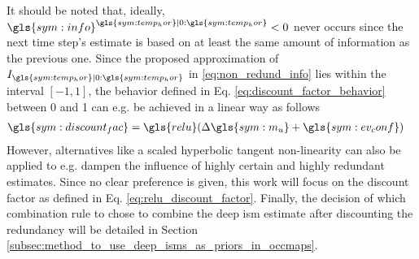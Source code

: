 It should be noted that, ideally, $\gls{sym:info}^{\gls{sym:temp_hor}|0:\gls{sym:temp_hor}} < 0$ never occurs since the next time step's estimate is based on at least the same amount of information as the previous one. Since the proposed approximation of $I_{\gls{sym:temp_hor}|0:\gls{sym:temp_hor}}$ in \eqref{eq:non_redund_info} lies within the interval $[-1,1]$, the behavior defined in Eq. \ref{eq:discount_factor_behavior} between 0 and 1 can e.g. be achieved in a linear way as follows
\begin{align}
	\label{eq:relu_discount_factor}
	\gls{sym:discount_fac} &= \gls{relu}(\Delta \gls{sym:m_u} + \gls{sym:ev_conf})
\end{align}
However, alternatives like a scaled hyperbolic tangent non-linearity can also be applied to e.g. dampen the influence of highly certain and highly redundant estimates. Since no clear preference is given, this work will focus on the discount factor as defined in Eq. \ref{eq:relu_discount_factor}. Finally, the decision of which combination rule to chose to combine the deep \gls{ism} estimate after discounting the redundancy will be detailed in Section \ref{subsec:method_to_use_deep_isms_as_priors_in_occmaps}.
%
